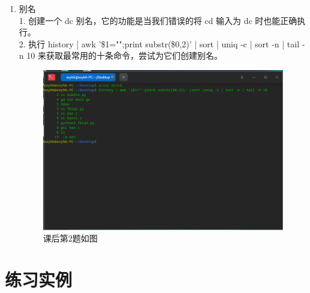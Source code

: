 \documentclass{ctexart}
\begin{document}
\begin{enumerate}
\item 别名\\
1. 创建一个 dc 别名，它的功能是当我们错误的将 cd 输入为 dc 时也能正确执行。\\
2. 执行 history | awk '{\$1="";print substr(\$0,2)}' | sort | uniq -c | sort -n | tail -n 10 
来获取最常用的十条命令，尝试为它们创建别名。
\begin{figure}[H]
    \centering
    \includegraphics[width=14cm]{dcb450f12a9c1cff67bbd67c16c58d2b.png}
    \caption{课后第2题如图}
    \label{fig:7}
\end{figure}
\end{enumerate}
\section{练习实例}
\end{document}
